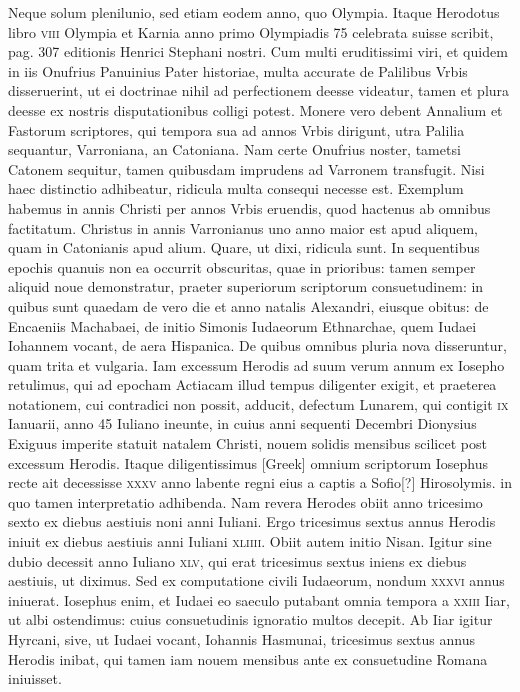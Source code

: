 Neque solum plenilunio, sed etiam eodem anno, quo
Olympia.
Itaque Herodotus libro \textsc{viii} Olympia et Karnia anno primo
Olympiadis 75 celebrata suisse scribit, pag. 307 editionis Henrici
Stephani nostri.
Cum multi eruditissimi viri, et quidem in iis
Onufrius Panuinius Pater historiae, multa accurate de Palilibus Vrbis
disseruerint, ut ei doctrinae nihil ad perfectionem deesse videatur,
tamen et plura deesse ex nostris disputationibus colligi potest.
Monere vero debent Annalium et Fastorum scriptores, qui tempora
sua ad annos Vrbis dirigunt, utra Palilia sequantur, Varroniana,
an Catoniana.
Nam certe Onufrius noster, tametsi Catonem sequitur,
tamen quibusdam imprudens ad Varronem transfugit.
Nisi
haec distinctio adhibeatur, ridicula multa consequi necesse est.
Exemplum habemus in annis Christi per annos Vrbis eruendis,
quod hactenus ab omnibus factitatum.
Christus in annis Varronianus
uno anno maior est apud aliquem, quam in Catonianis apud alium.
Quare, ut dixi, ridicula sunt.
In sequentibus epochis quanuis
non ea occurrit obscuritas, quae in prioribus: tamen semper aliquid
noue demonstratur, praeter superiorum scriptorum consuetudinem:
in quibus sunt quaedam de vero die et anno natalis Alexandri, eiusque
obitus: de Encaeniis Machabaei, de initio Simonis Iudaeorum
Ethnarchae, quem Iudaei Iohannem vocant, de aera Hispanica.
De quibus omnibus pluria nova disseruntur, quam trita et vulgaria.
Iam
excessum Herodis ad suum verum annum ex Iosepho retulimus,
qui ad epocham Actiacam illud tempus diligenter exigit, et praeterea
notationem, cui contradici non possit, adducit, defectum Lunarem,
qui contigit \textsc{ix} Ianuarii, anno 45 Iuliano ineunte, in cuius
anni sequenti Decembri Dionysius Exiguus imperite statuit natalem
Christi, nouem solidis mensibus scilicet post excessum Herodis.
Itaque diligentissimus \textgreek{[Greek]} omnium scriptorum Iosephus
recte ait decessisse \textsc{xxxv} anno labente regni eius a captis a Sofio[?]
Hirosolymis. in quo tamen interpretatio adhibenda.
Nam revera Herodes
obiit anno tricesimo sexto ex diebus aestiuis noni anni Iuliani.
Ergo tricesimus sextus annus Herodis iniuit ex diebus aestiuis anni
Iuliani \textsc{xliiii}.
Obiit autem initio Nisan.
Igitur sine dubio decessit
anno Iuliano \textsc{xlv}, qui erat tricesimus sextus iniens ex diebus aestiuis,
ut diximus.
Sed ex computatione civili Iudaeorum, nondum
\textsc{xxxvi} annus iniuerat.
Iosephus enim, et Iudaei eo saeculo putabant
omnia tempora a \textsc{xxiii} Iiar, ut albi ostendimus: cuius consuetudinis
ignoratio multos decepit.
Ab Iiar igitur Hyrcani, sive, ut Iudaei
vocant, Iohannis Hasmunai, tricesimus sextus annus Herodis inibat,
qui tamen iam nouem mensibus ante ex consuetudine Romana iniuisset.
{}

